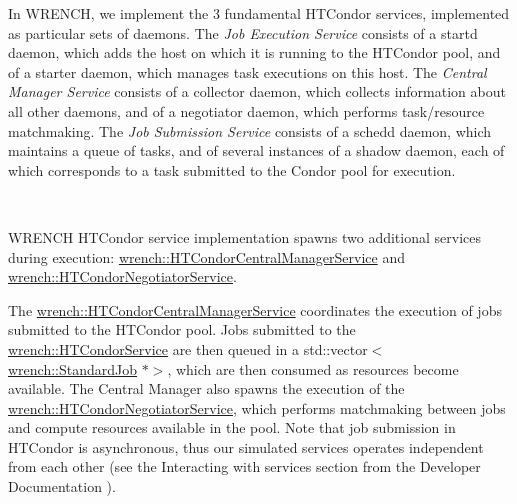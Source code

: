 In W\+R\+E\+N\+CH, we implement the 3 fundamental H\+T\+Condor services, implemented as particular sets of daemons. The {\itshape Job Execution Service} consists of a {\ttfamily startd} daemon, which adds the host on which it is running to the H\+T\+Condor pool, and of a {\ttfamily starter} daemon, which manages task executions on this host. The {\itshape Central Manager Service} consists of a {\ttfamily collector} daemon, which collects information about all other daemons, and of a {\ttfamily negotiator} daemon, which performs task/resource matchmaking. The {\itshape Job Submission Service} consists of a {\ttfamily schedd} daemon, which maintains a queue of tasks, and of several instances of a {\ttfamily shadow} daemon, each of which corresponds to a task submitted to the Condor pool for execution.



~

W\+R\+E\+N\+CH H\+T\+Condor service implementation spawns two additional services during execution\+: \hyperlink{classwrench_1_1_h_t_condor_central_manager_service}{wrench\+::\+H\+T\+Condor\+Central\+Manager\+Service} and \hyperlink{classwrench_1_1_h_t_condor_negotiator_service}{wrench\+::\+H\+T\+Condor\+Negotiator\+Service}.

The \hyperlink{classwrench_1_1_h_t_condor_central_manager_service}{wrench\+::\+H\+T\+Condor\+Central\+Manager\+Service} coordinates the execution of jobs submitted to the H\+T\+Condor pool. Jobs submitted to the \hyperlink{classwrench_1_1_h_t_condor_service}{wrench\+::\+H\+T\+Condor\+Service} are then queued in a {\ttfamily std\+::vector$<$\hyperlink{classwrench_1_1_standard_job}{wrench\+::\+Standard\+Job} $\ast$$>$}, which are then consumed as resources become available. The Central Manager also spawns the execution of the \hyperlink{classwrench_1_1_h_t_condor_negotiator_service}{wrench\+::\+H\+T\+Condor\+Negotiator\+Service}, which performs matchmaking between jobs and compute resources available in the pool. Note that job submission in H\+T\+Condor is asynchronous, thus our simulated services operates independent from each other (see the Interacting with services section from the Developer Documentation ). 